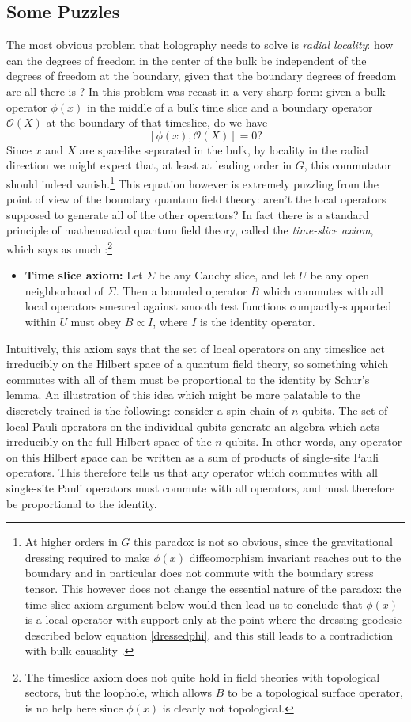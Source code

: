 \documentclass[toc]{PoS}
\newcommand{\be}{\begin{equation}}
\newcommand{\ee}{\end{equation}}
\newcommand{\bi}{\begin{itemize}}
\newcommand{\ei}{\end{itemize}}
\newcommand{\mO}{\mathcal{O}}
\begin{document}
\subsection{Some Puzzles}
The most obvious problem that holography needs to solve is \textit{radial locality}: how can the degrees of freedom in the center of the bulk be independent of the degrees of freedom at the boundary, given that the boundary degrees of freedom are all there is \cite{Polchinski:1999yd}?  In \cite{Almheiri:2014lwa} this problem was recast in a very sharp form: given a bulk operator $\phi(x)$ in the middle of a bulk time slice and a boundary operator $\mO(X)$ at the boundary of that timeslice, do we have
\be\label{radialc}
[\phi(x),\mO(X)]=0?
\ee
Since $x$ and $X$ are spacelike separated in the bulk, by locality in the radial direction we might expect that, at least at leading order in $G$, this commutator should indeed vanish.\footnote{At higher orders in $G$ this paradox is not so obvious, since the gravitational dressing required to make $\phi(x)$ diffeomorphism invariant reaches out to the boundary and in particular does not commute with the boundary stress tensor.  This however does not change the essential nature of the paradox: the time-slice axiom argument below would then lead us to conclude that $\phi(x)$ is a local operator with support only at the point where the dressing geodesic described below equation \eqref{dressedphi}, and this still leads to a contradiction with bulk causality \cite{Almheiri:2014lwa}.}  This equation however is extremely puzzling from the point of view of the boundary quantum field theory: aren't the local operators supposed to generate all of the other operators?  In fact there is a standard principle of mathematical quantum field theory, called the \textit{time-slice axiom}, which says as much \cite{Streater:1989vi}:\footnote{The timeslice axiom does not quite hold in field theories with topological sectors, but the loophole, which allows $B$ to be a topological surface operator, is no help here since $\phi(x)$ is clearly not topological.}
\bi
\item \textbf{Time slice axiom:} Let $\Sigma$ be any Cauchy slice, and let $U$ be any open neighborhood of $\Sigma$.  Then a bounded operator $B$ which commutes with all local operators smeared against smooth test functions compactly-supported within $U$ must obey $B\propto I$, where $I$ is the identity operator.
\ei
Intuitively, this axiom says that the set of local operators on any timeslice act irreducibly on the Hilbert space of a quantum field theory, so something which commutes with all of them must be proportional to the identity by Schur's lemma. An illustration of this idea which might be more palatable to the discretely-trained is the following: consider a spin chain of $n$ qubits.  The set of local Pauli operators on the individual qubits generate an algebra which acts irreducibly on the full Hilbert space of the $n$ qubits.  In other words, any operator on this Hilbert space can be written as a sum of products of single-site Pauli operators.  This therefore tells us that any operator which commutes with all single-site Pauli operators must commute with all operators, and must therefore be proportional to the identity.  
\end{document}
